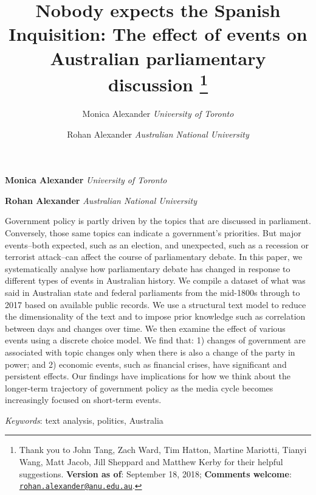 \documentclass[12pt,]{article}
\title{Nobody expects the Spanish Inquisition: The effect of events on
Australian parliamentary discussion \thanks{Thank you to John Tang, Zach Ward, Tim Hatton, Martine Mariotti, Tianyi
Wang, Matt Jacob, Jill Sheppard and Matthew Kerby for their helpful
suggestions. \textbf{Version as of}: September 18, 2018;
\textbf{Comments welcome}:
\href{mailto:rohan.alexander@anu.edu.au}{\nolinkurl{rohan.alexander@anu.edu.au}}.}  }
\author{\Large Monica Alexander\vspace{0.05in} \newline\normalsize\emph{University of Toronto}   \and \Large Rohan Alexander\vspace{0.05in} \newline\normalsize\emph{Australian National University}  }
\date{}
\newcommand*{\authorfont}{\fontfamily{phv}\selectfont}
\renewenvironment{abstract}
 {{%
    \setlength{\leftmargin}{0mm}
    \setlength{\rightmargin}{\leftmargin}%
  }%
  \relax}
 {\endlist}
\theoremstyle{definition}
\theoremstyle{definition}
\theoremstyle{definition}
\theoremstyle{remark}
\begin{document}
	
%

{%
\setlength{\parindent}{0pt}
\thispagestyle{plain}
{\fontsize{18}{20}\selectfont\raggedright 
\maketitle  %

}

{
   \vskip 13.5pt\relax \normalsize\fontsize{11}{12} 
\textbf{\authorfont Monica Alexander} \hskip 15pt \emph{\small University of Toronto}   \par \textbf{\authorfont Rohan Alexander} \hskip 15pt \emph{\small Australian National University}   

}

}








\begin{abstract}

    \hbox{\vrule height .2pt width 39.14pc}

    \vskip 8.5pt %

\noindent Government policy is partly driven by the topics that are discussed in
parliament. Conversely, those same topics can indicate a government's
priorities. But major events--both expected, such as an election, and
unexpected, such as a recession or terrorist attack--can affect the
course of parliamentary debate. In this paper, we systematically analyse
how parliamentary debate has changed in response to different types of
events in Australian history. We compile a dataset of what was said in
Australian state and federal parliaments from the mid-1800s through to
2017 based on available public records. We use a structural text model
to reduce the dimensionality of the text and to impose prior knowledge
such as correlation between days and changes over time. We then examine
the effect of various events using a discrete choice model. We find
that: 1) changes of government are associated with topic changes only
when there is also a change of the party in power; and 2) economic
events, such as financial crises, have significant and persistent
effects. Our findings have implications for how we think about the
longer-term trajectory of government policy as the media cycle becomes
increasingly focused on short-term events.


\vskip 8.5pt \noindent \emph{Keywords}: text analysis, politics, Australia \par

    \hbox{\vrule height .2pt width 39.14pc}



\end{abstract}
\end{document}
